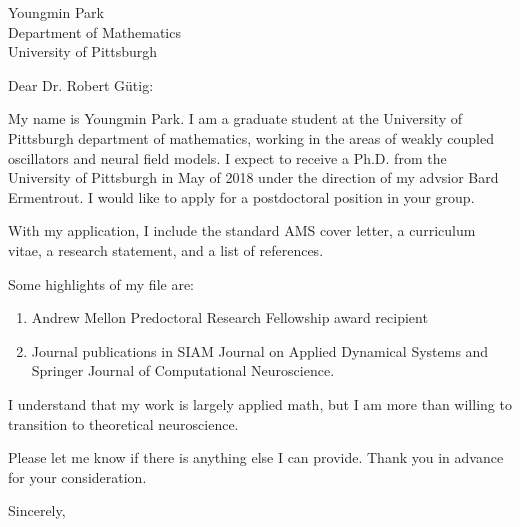 \documentclass[a4paper,11pt]{letter}
\begin{document}
\begin{letter}{Youngmin Park \\ Department of Mathematics\\ University of Pittsburgh}
 

\opening{Dear Dr. Robert Gütig:}

 My name is Youngmin Park. I am a graduate student at the University of Pittsburgh department of mathematics, working in the areas of weakly coupled oscillators and neural field models. I expect to receive a Ph.D. from the University of Pittsburgh in May of 2018 under the direction of my advsior Bard Ermentrout. I would like to apply for a postdoctoral position in your group.
 
 With my application, I include the standard AMS cover letter, a curriculum vitae, a research statement, and a list of references.
 
 Some highlights of my file are:
 \begin{enumerate}
  \item Andrew Mellon Predoctoral Research Fellowship award recipient
  \item Journal publications in SIAM Journal on Applied Dynamical Systems and Springer Journal of Computational Neuroscience.
 \end{enumerate}
 
 I understand that my work is largely applied math, but I am more than willing to transition to theoretical neuroscience.
 
 Please let me know if there is anything else I can provide. Thank you in advance for your consideration.

 \closing{Sincerely,}
 
 
 
\end{letter}
\end{document}

